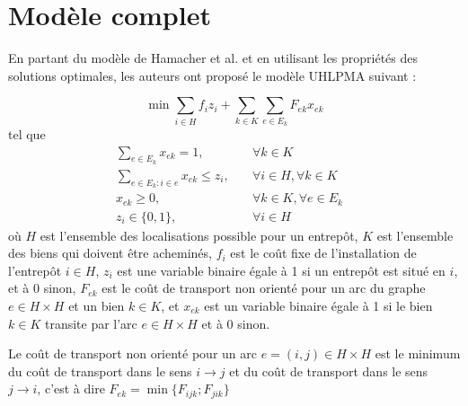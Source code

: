 \section{Modèle complet}

En partant du modèle de Hamacher et al. \cite[Adapting polyhedral properties from facility to hub location problems (2004)]{hln} et en utilisant les propriétés des solutions optimales, les auteurs ont proposé le modèle UHLPMA suivant : 

\[ \min \sum_{i \in H}f_iz_i + \sum_{k \in K}\sum_{e \in E_k}F_{ek}x_{ek}\]
tel que
\begin{subequations}
    \begin{align}
        \sum_{e \in E_k}x_{ek} = 1, \quad &\forall{k\in K}&\\
        \sum_{e \in E_k:i\in e}x_{ek} \le z_i,\quad &\forall{i \in H}, \forall{k\in K}&\\
        x_{ek} \ge 0, \quad &\forall{k \in K}, \forall{e \in E_k}&\\
        z_i\in \{0,1\},\quad &\forall{ i \in H}&
    \end{align}
\end{subequations}
 où $H$ est l'ensemble des localisations possible pour un entrepôt, $K$ est l'ensemble des biens qui doivent être acheminés, $f_i$ est le coût fixe de l'installation de l'entrepôt $i\in H$, $z_i$ est une variable binaire égale à 1 si un entrepôt est situé en $i$, et à 0 sinon, $F_{ek}$ est le coût de transport non orienté pour un arc du graphe $e \in H\times H$ et un bien $k \in K$, et $x_{ek}$ est un variable binaire égale à 1 si le bien $k \in K$ transite par l'arc $e \in H\times H$ et à 0 sinon.
 
 Le coût de transport non orienté pour un arc $e = (i,j) \in H\times H$ est le minimum du coût de transport dans le sens $i \rightarrow j$ et du coût de transport dans le sens $j \rightarrow i$, c'est à dire $F_{ek} = \min \{ F_{ijk};F_{jik}\}$


